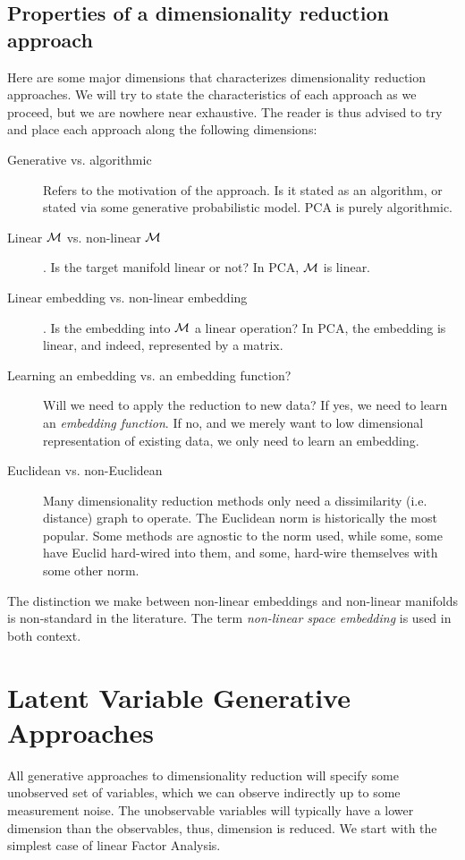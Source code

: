 \documentclass[12pt,a4paper]{article}
\begin{document}
\subsection{Properties of a dimensionality reduction approach}
Here are some major dimensions that characterizes dimensionality reduction approaches. 
We will try to state the characteristics of each approach as we proceed, but we are nowhere near exhaustive.
The reader is thus advised to try and place each approach along the following dimensions:
\begin{description}
	\item [Generative vs. algorithmic] Refers to the motivation of the approach. Is it stated as an algorithm, or stated via some generative probabilistic model. 
	PCA is purely algorithmic. 

	\item [Linear $\mathcal{M}$ vs. non-linear $\mathcal{M}$]. 
	Is the target manifold linear or not?
	In PCA, $\mathcal{M}$ is linear.

	\item [Linear embedding vs. non-linear embedding]. 
	Is the embedding into $\mathcal{M}$ a linear operation?
	In PCA, the embedding is linear, and indeed, represented by a matrix. 
	
	\item [Learning an embedding vs. an embedding function?]
	Will we need to apply the reduction to new data? 
	If yes, we need to learn an \emph{embedding function}. 
	If no, and we merely want to low dimensional representation of existing data, we only need to learn an embedding. 
	
	\item [Euclidean vs. non-Euclidean] 
	Many dimensionality reduction methods only need a dissimilarity (i.e. distance) graph to operate. 
	The Euclidean norm is historically the most popular.
	Some methods are agnostic to the norm used, while some, some have Euclid hard-wired into them, and some, hard-wire themselves with some other norm. 
\end{description}

\begin{remark}
	The distinction we make between non-linear embeddings and non-linear manifolds is non-standard in the literature. 
	The term \emph{non-linear space embedding} is used in both context. 
\end{remark}



\section{Latent Variable Generative Approaches}
All generative approaches to dimensionality reduction will specify some unobserved set of variables, which we can observe indirectly up to some measurement noise. 
The unobservable variables will typically have a lower dimension than the observables, thus, dimension is reduced. 
We start with the simplest case of linear Factor Analysis. 
\end{document}
